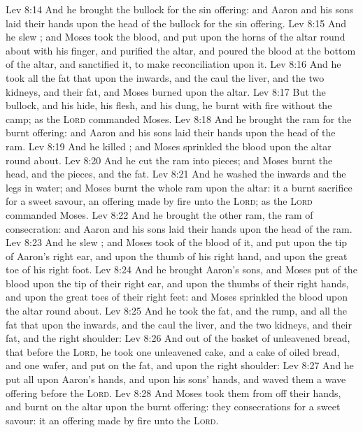 \vs Lev 8:14 And he brought the bullock for the sin offering: and Aaron and his sons laid their hands upon the head of the bullock for the sin offering.
\vs Lev 8:15 And he slew ; and Moses took the blood, and put  upon the horns of the altar round about with his finger, and purified the altar, and poured the blood at the bottom of the altar, and sanctified it, to make reconciliation upon it.
\vs Lev 8:16 And he took all the fat that  upon the inwards, and the caul  the liver, and the two kidneys, and their fat, and Moses burned  upon the altar.
\vs Lev 8:17 But the bullock, and his hide, his flesh, and his dung, he burnt with fire without the camp; as the \textsc{Lord} commanded Moses.
\vs Lev 8:18 And he brought the ram for the burnt offering: and Aaron and his sons laid their hands upon the head of the ram.
\vs Lev 8:19 And he killed ; and Moses sprinkled the blood upon the altar round about.
\vs Lev 8:20 And he cut the ram into pieces; and Moses burnt the head, and the pieces, and the fat.
\vs Lev 8:21 And he washed the inwards and the legs in water; and Moses burnt the whole ram upon the altar: it  a burnt sacrifice for a sweet savour,  an offering made by fire unto the \textsc{Lord}; as the \textsc{Lord} commanded Moses.
\vs Lev 8:22 And he brought the other ram, the ram of consecration: and Aaron and his sons laid their hands upon the head of the ram.
\vs Lev 8:23 And he slew ; and Moses took of the blood of it, and put  upon the tip of Aaron's right ear, and upon the thumb of his right hand, and upon the great toe of his right foot.
\vs Lev 8:24 And he brought Aaron's sons, and Moses put of the blood upon the tip of their right ear, and upon the thumbs of their right hands, and upon the great toes of their right feet: and Moses sprinkled the blood upon the altar round about.
\vs Lev 8:25 And he took the fat, and the rump, and all the fat that  upon the inwards, and the caul  the liver, and the two kidneys, and their fat, and the right shoulder:
\vs Lev 8:26 And out of the basket of unleavened bread, that  before the \textsc{Lord}, he took one unleavened cake, and a cake of oiled bread, and one wafer, and put  on the fat, and upon the right shoulder:
\vs Lev 8:27 And he put all upon Aaron's hands, and upon his sons' hands, and waved them  a wave offering before the \textsc{Lord}.
\vs Lev 8:28 And Moses took them from off their hands, and burnt  on the altar upon the burnt offering: they  consecrations for a sweet savour: it  an offering made by fire unto the \textsc{Lord}.

